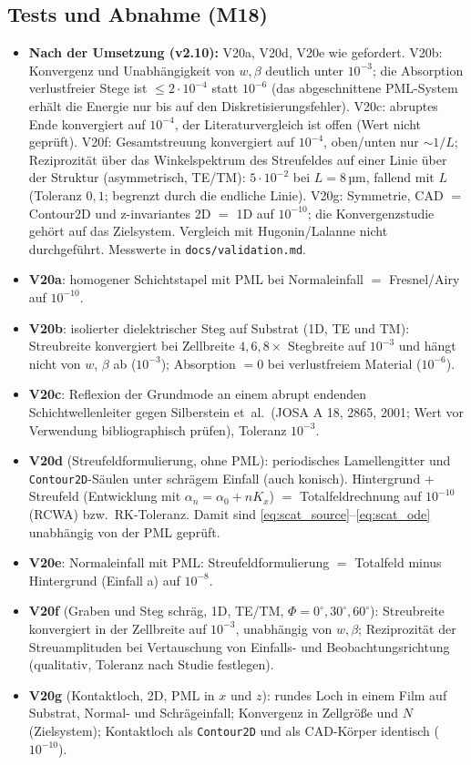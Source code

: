 \subsection{Tests und Abnahme (M18)}
\begin{itemize}[nosep]
  \item \textbf{Nach der Umsetzung (v2.10):} V20a, V20d, V20e wie gefordert. V20b: Konvergenz und Unabhängigkeit von
        $w,\beta$ deutlich unter $10^{-3}$; die Absorption verlustfreier Stege ist $\le2\cdot10^{-4}$ statt $10^{-6}$ (das
        abgeschnittene PML-System erhält die Energie nur bis auf den Diskretisierungsfehler). V20c: abruptes Ende
        konvergiert auf $10^{-4}$, der Literaturvergleich ist offen (Wert nicht geprüft). V20f: Gesamtstreuung konvergiert
        auf $10^{-4}$, oben/unten nur $\sim1/L$; Reziprozität über das Winkelspektrum des Streufeldes auf einer Linie über der Struktur
        (asymmetrisch, TE/TM): $5\cdot10^{-2}$ bei $L=8\,$µm, fallend mit $L$ (Toleranz $0{,}1$; begrenzt durch die endliche Linie). V20g: Symmetrie, CAD $=$ Contour2D und
        z-invariantes 2D $=$ 1D auf $10^{-10}$; die Konvergenzstudie gehört auf das Zielsystem. Vergleich mit
        Hugonin/Lalanne nicht durchgeführt. Messwerte in \verb|docs/validation.md|.
  \item \textbf{V20a}: homogener Schichtstapel mit PML bei Normaleinfall $=$ Fresnel/Airy auf $10^{-10}$.
  \item \textbf{V20b}: isolierter dielektrischer Steg auf Substrat (1D, TE und TM): Streubreite konvergiert bei
        Zellbreite $4,6,8\times$ Stegbreite auf $10^{-3}$ und hängt nicht von $w$, $\beta$ ab ($10^{-3}$);
        Absorption $=0$ bei verlustfreiem Material ($10^{-6}$).
  \item \textbf{V20c}: Reflexion der Grundmode an einem abrupt endenden Schichtwellenleiter gegen Silberstein et~al.\
        (JOSA A 18, 2865, 2001; Wert vor Verwendung bibliographisch prüfen), Toleranz $10^{-3}$.
  \item \textbf{V20d} (Streufeldformulierung, ohne PML): periodisches Lamellengitter und \verb|Contour2D|-Säulen unter
        schrägem Einfall (auch konisch). Hintergrund $+$ Streufeld (Entwicklung mit $\alpha_n=\alpha_0+nK_x$) $=$ Totalfeldrechnung
        auf $10^{-10}$ (RCWA) bzw.\ RK-Toleranz. Damit sind \eqref{eq:scat_source}--\eqref{eq:scat_ode} unabhängig von der PML geprüft.
  \item \textbf{V20e}: Normaleinfall mit PML: Streufeldformulierung $=$ Totalfeld minus Hintergrund (Einfall a) auf $10^{-8}$.
  \item \textbf{V20f} (Graben und Steg schräg, 1D, TE/TM, $\Phi=0^\circ,30^\circ,60^\circ$): Streubreite konvergiert in der
        Zellbreite auf $10^{-3}$, unabhängig von $w,\beta$; Reziprozität der Streuamplituden bei Vertauschung von Einfalls- und
        Beobachtungsrichtung (qualitativ, Toleranz nach Studie festlegen).
  \item \textbf{V20g} (Kontaktloch, 2D, PML in $x$ und $z$): rundes Loch in einem Film auf Substrat, Normal- und Schrägeinfall;
        Konvergenz in Zellgröße und $N$ (Zielsystem); Kontaktloch als \verb|Contour2D| und als CAD-Körper identisch ($10^{-10}$).
\end{itemize}

